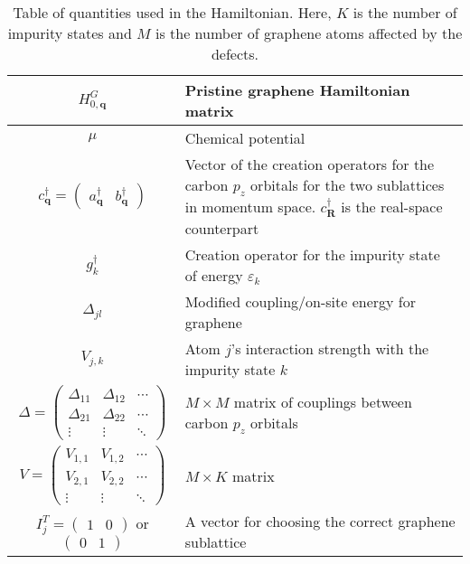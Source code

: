 \documentclass[aps, prb, superscriptaddress, preprint, floatfix]{revtex4-1}
\begin{document}
%
\begin{table*}
  \centering
\begin{tabular}{ |c|m{10cm}| } 
 \hline
$H_{0,\mathbf{q}}^G$ & Pristine graphene Hamiltonian matrix
 \\
 \hline
$\mu$ & Chemical potential
\\ 
 \hline 
 $c^\dagger_{\mathbf{q}} = \begin{pmatrix} a^\dagger_{\mathbf{q}}&b^\dagger_{\mathbf{q}}\end{pmatrix}$ & Vector of the creation operators for the carbon $p_z$ orbitals for the two sublattices in momentum space. $c^\dagger_{\mathbf{R}}$ is the real-space counterpart
 \\ 
 \hline 
 $g^\dagger_k$ & Creation operator for the impurity state of energy $\varepsilon_k$
 \\
 \hline
 $\Delta_{jl}$ & Modified coupling/on-site energy for graphene
 \\ 
 \hline 
 $V_{j,k}$ & Atom $j$'s interaction strength with the impurity state $k$
 \\
\hline 
 $\Delta
 = \begin{pmatrix}
 	\Delta_{11} & \Delta_{12}& \cdots
 	\\
 	\Delta_{21} & \Delta_{22}& \cdots
 	\\
 	\vdots & \vdots & \ddots
 \end{pmatrix}$ & $M\times M$ matrix of couplings between carbon $p_z$ orbitals  \\ 
 \hline 
 $V= \begin{pmatrix}
 	V_{1,1} & V_{1,2}& \cdots
 	\\
 	V_{2,1} & V_{2,2}& \cdots
 	\\
 	\vdots & \vdots & \ddots
 \end{pmatrix}$ & $M\times K$ matrix
\\ 
 \hline
  $I_j^T = \begin{pmatrix} 1 & 0 \end{pmatrix}$ or $ \begin{pmatrix} 0 & 1 \end{pmatrix}$ & A vector for choosing the correct graphene sublattice
   \\
 \hline
\end{tabular}
  \caption{Table of quantities used in the Hamiltonian. Here, $K$ is the number of impurity states and $M$ is the number of graphene atoms affected by the defects.}
  \label{tab:Reference}
\end{table*}
%
\end{document}
